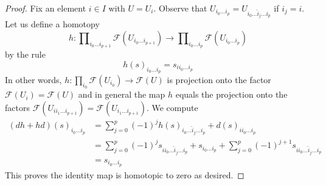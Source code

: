 \documentclass[10pt,a4paper]{amsart}
\theoremstyle{plain}
\theoremstyle{definition}
\theoremstyle{remark}
\numberwithin{equation}{subsection}
\begin{document}
\begin{proof}
Fix an element $i \in I$ with $U = U_i$. Observe that
$U_{i_0 \ldots i_p} = U_{i_0 \ldots \hat i_j \ldots i_p}$ if $i_j = i$.
Let us define a homotopy
$$
h :
\prod\nolimits_{i_0 \ldots i_{p + 1}} \mathcal{F}(U_{i_0 \ldots i_{p + 1}})
\longrightarrow
\prod\nolimits_{i_0 \ldots i_p} \mathcal{F}(U_{i_0 \ldots i_p})
$$
by the rule
$$
h(s)_{i_0 \ldots i_p} = s_{i i_0 \ldots i_p}
$$
In other words, $h : \prod_{i_0} \mathcal{F}(U_{i_0}) \to \mathcal{F}(U)$
is projection onto the factor $\mathcal{F}(U_i) = \mathcal{F}(U)$
and in general the map $h$ equals the projection onto the factors
$\mathcal{F}(U_{i i_1 \ldots i_{p + 1}}) =
\mathcal{F}(U_{i_1 \ldots i_{p + 1}})$.
We compute
\begin{align*}
(dh + hd)(s)_{i_0 \ldots i_p}
& =
\sum\nolimits_{j = 0}^p
(-1)^j
h(s)_{i_0 \ldots \hat i_j \ldots i_p}
+
d(s)_{i i_0 \ldots i_p}\\
& =
\sum\nolimits_{j = 0}^p
(-1)^j
s_{i i_0 \ldots \hat i_j \ldots i_p}
+
s_{i_0 \ldots i_p}
+
\sum\nolimits_{j = 0}^p
(-1)^{j + 1}
s_{i i_0 \ldots \hat i_j \ldots i_p} \\
& =
s_{i_0 \ldots i_p}
\end{align*}
This proves the identity map is homotopic to zero as desired.
\end{proof}
\end{document}

